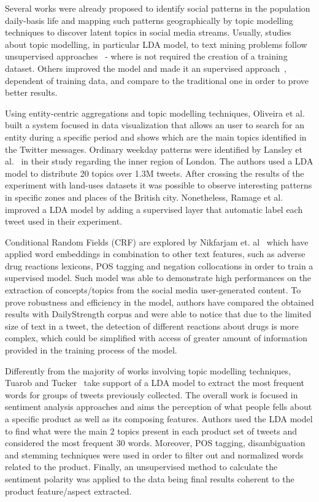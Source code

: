 Several works were already proposed to identify social patterns in the population daily-basis life and mapping such patterns geographically by topic modelling techniques to discover latent topics in social media streams. Usually, studies about topic modelling, in particular \gls{LDA} model, to text mining problems follow unsupervised approaches~\cite{lansley2016geography,oliveira2016sentibubbles} - where is not required the creation of a training dataset. Others improved the model and made it an supervised approach~\cite{ramage2010characterizing}, dependent of training data, and compare to the traditional one in order to prove better results.

Using entity-centric aggregations and topic modelling techniques, Oliveira et al.~\cite{oliveira2016sentibubbles} built a system focused in data visualization that allows an user to search for an entity during a specific period and shows which are the main topics identified in the Twitter messages.  Ordinary weekday patterns were identified by Lansley et al.~\cite{lansley2016geography} in their study regarding the inner region of London. The authors used a \gls{LDA} model to distribute 20 topics over 1.3M tweets. After crossing the results of the experiment with land-uses datasets it was possible to observe interesting patterns in specific zones and places of the British city. Nonetheless, Ramage et al.~\cite{ramage2010characterizing} improved a \gls{LDA} model by adding a supervised layer that automatic label each tweet used in their experiment.

Conditional Random Fields (CRF) are explored by Nikfarjam et. al~\cite{nikfarjam2015pharmacovigilance} which have applied word embeddings in combination to other text features, such as adverse drug reactions lexicons, POS tagging and negation collocations in order to train a supervised model. Such model was able to demonstrate high performances on the extraction of concepts/topics from the social media user-generated content. To prove robustness and efficiency in the model, authors have compared the obtained results with DailyStrength corpus and were able to notice that due to the limited size of text in a tweet, the detection of different reactions about drugs is more complex, which could be simplified with access of greater amount of information provided in the training process of the model.

Differently from the majority of works involving topic modelling techniques, Tuarob and Tucker~\cite{tuarob2015quantifying} take support of a \gls{LDA} model to extract the most frequent words for groups of tweets previously collected. The overall work is focused in sentiment analysis approaches and aims the perception of what people fells about a specific product as well as its composing features. Authors used the \gls{LDA} model to find what were the main 2 topics present in each product set of tweets and considered the most frequent 30 words. Moreover, POS tagging, disambiguation and stemming techniques were used in order to filter out and normalized words related to the product. Finally, an unsupervised method to calculate the sentiment polarity was applied to the data being final results coherent to the product feature/aspect extracted.

